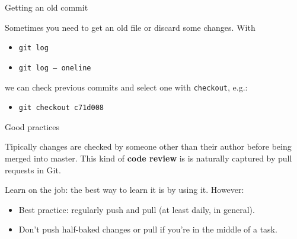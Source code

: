 \documentclass{beamer}
\begin{document}
\begin{frame}{Getting an old commit}

Sometimes you need to get an old file or discard some changes. With 

\begin{itemize}
 \item \texttt{git log} 
 \item \texttt{git log -- oneline}
\end{itemize}

we can check previous commits and select one with \texttt{checkout}, e.g.:
\begin{itemize}
 \item \texttt{git checkout c71d008}
\end{itemize}

\end{frame}


\begin{frame}{Good practices}


Tipically changes are checked by someone other than their
author before being merged into master. This kind of \textbf{code review} is is naturally captured by pull requests in Git.

Learn on the job: the best way to learn it is by using it. However:
\begin{itemize}
  \item Best practice: regularly push and pull (at least daily, in general).
  \item Don't push half-baked changes or pull if you're in the middle of a task.
\end{itemize}


\end{frame}



% 
% 


\end{document}
